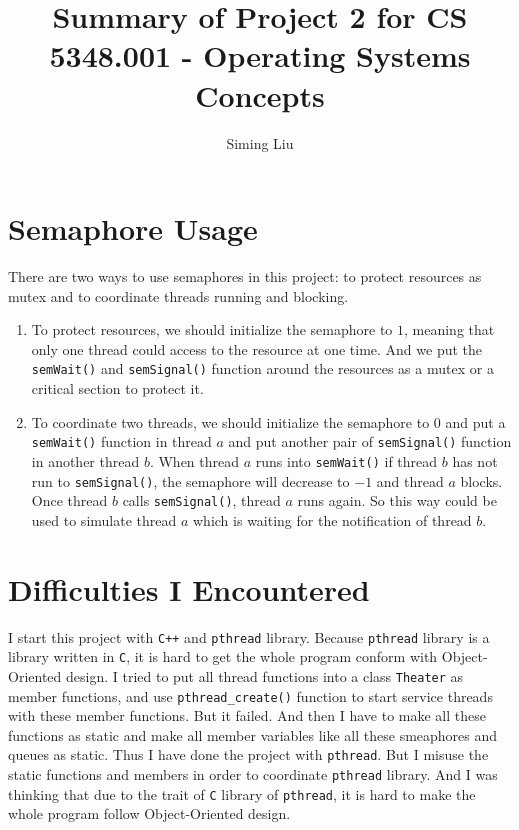 \documentclass[a4paper]{report}
\begin{document}
\title{Summary of Project 2 for CS 5348.001 - Operating Systems Concepts}

\author{Siming Liu}

\maketitle{}

\section*{Semaphore Usage}
There are two ways to use semaphores in this project: to protect resources as mutex and to coordinate threads running and blocking.
\begin{enumerate}[label=\textbf{\textit{\alph*}})]
  \item To protect resources, we should initialize the semaphore to $1$, meaning that only one thread could access to the resource at one time. And we put the \lstinline{semWait()} and \lstinline{semSignal()} function around the resources as a mutex or a critical section to protect it.
  \item To coordinate two threads, we should initialize the semaphore to $0$ and put a \lstinline{semWait()} function in thread $a$ and put another pair of \lstinline{semSignal()} function in another thread $b$. When thread $a$ runs into \lstinline{semWait()} if thread $b$ has not run to \lstinline{semSignal()}, the semaphore will decrease to $-1$ and thread $a$ blocks. Once thread $b$ calls \lstinline{semSignal()}, thread $a$ runs again. So this way could be used to simulate thread $a$ which is waiting for the notification of thread $b$.
\end{enumerate}

\section*{Difficulties I Encountered}
I start this project with \lstinline{C++} and \lstinline{pthread} library. Because \lstinline{pthread} library is a library written in \lstinline{C}, it is hard to get the whole program conform with Object-Oriented design. I tried to put all thread functions into a class \lstinline{Theater} as member functions, and use \lstinline{pthread_create()} function to start service threads with these member functions. But it failed. And then I have to make all these functions as static and make all member variables like all these smeaphores and queues as static. Thus I have done the project with \lstinline{pthread}. But I misuse the static functions and members in order to coordinate \lstinline{pthread} library. And I was thinking that due to the trait of \lstinline{C} library of \lstinline{pthread}, it is hard to make the whole program follow Object-Oriented design.
\end{document}
